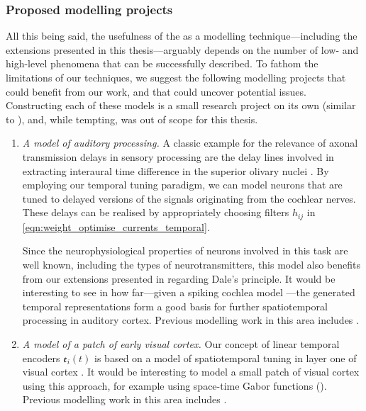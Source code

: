 \subsubsection{Proposed modelling projects}
All this being said, the usefulness of the \NEF as a modelling technique---including the extensions presented in this thesis---arguably depends on the number of low- and high-level phenomena that can be successfully described.
To fathom the limitations of our techniques, we suggest the following modelling projects that could benefit from our work, and that could uncover potential issues.
Constructing each of these models is a small research project on its own (similar to ), and, while tempting, was out of scope for this thesis.
\begin{enumerate}[1.]
	\item \emph{A model of auditory processing.} A classic example for the relevance of axonal transmission delays in sensory processing are the delay lines involved in extracting interaural time difference in the superior olivary nuclei \citep[Chapter~31]{kandel2012principles}.
	By employing our temporal tuning paradigm, we can model neurons that are tuned to delayed versions of the signals originating from the cochlear nerves.
	These delays can be realised by appropriately choosing filters $h_{ij}$ in \cref{eqn:weight_optimise_currents_temporal}.

	Since the neurophysiological properties of neurons involved in this task are well known, including the types of neurotransmitters, this model also benefits from our extensions presented in  regarding Dale's principle.
	It would be interesting to see in how far---given a spiking cochlea model \citep[e.g.,][]{zilany2006modeling}---the generated temporal representations form a good basis for further spatiotemporal processing in auditory cortex.
	Previous modelling work in this area includes \citet{bekolay2016biologically}.

	\item \emph{A model of a patch of early visual cortex.}
	Our concept of linear temporal encoders $\mathfrak{e}_i(t)$ is based on a model of spatiotemporal tuning in layer one of visual cortex \citep{carandini1999linearity}.
	It would be interesting to model a small patch of visual cortex using this approach, for example using space-time Gabor functions ().
	Previous modelling work in this area includes \citet{hurzook2012mechanistic}.


\end{enumerate}
